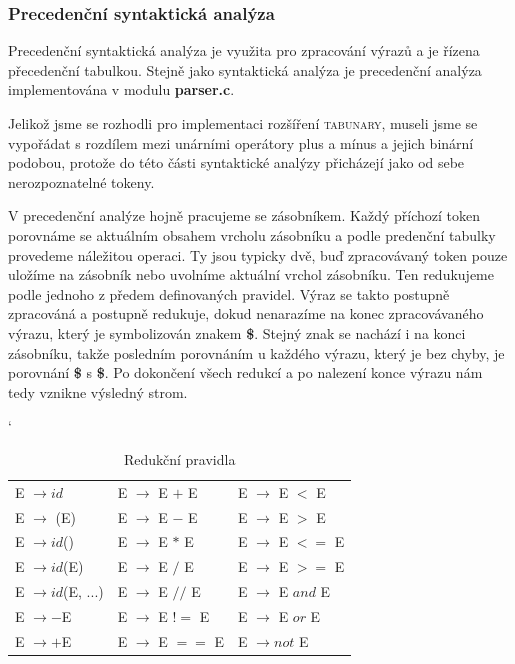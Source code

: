 \documentclass[12pt]{article}
\begin{document}
\subsubsection{Precedenční syntaktická analýza}
Precedenční syntaktická analýza je využita pro zpracování výrazů a je řízena přecedenční tabulkou. Stejně jako syntaktická analýza je precedenční analýza implementována v modulu \textbf{parser.c}.

Jelikož jsme se rozhodli pro implementaci rozšíření \textsc{tabunary}, museli jsme se vypořádat s rozdílem mezi unárními operátory plus a mínus a jejich binární podobou, protože do této části syntaktické analýzy přicházejí jako od sebe nerozpoznatelné tokeny. 

V precedenční analýze hojně pracujeme se zásobníkem. Každý příchozí token porovnáme se aktuálním obsahem vrcholu zásobníku a podle predenční tabulky provedeme náležitou operaci. Ty jsou typicky dvě, buď zpracovávaný token pouze uložíme na zásobník nebo uvolníme aktuální vrchol zásobníku. Ten redukujeme podle jednoho z předem definovaných pravidel. Výraz se takto postupně zpracováná a postupně redukuje, dokud nenarazíme na konec zpracovávaného výrazu, který je symbolizován znakem \textbf{\$}. Stejný znak se nachází i na konci zásobníku, takže posledním porovnáním u každého výrazu, který je bez chyby, je porovnání \textbf{\$} s \textbf{\$}. Po dokončení všech redukcí a po nalezení konce výrazu nám tedy vznikne výsledný strom.
\begin{table}[!htbp]
\catcode`
\centering
    \begin{tabular}{l l l}
         E $\rightarrow id$ & E $\rightarrow$ E $+$ E & E $\rightarrow$ E $<$ E \\
         E $\rightarrow $ (E) & E $\rightarrow$ E $-$ E & E $\rightarrow$ E $>$ E \\
         E $\rightarrow id$() & E $\rightarrow$ E $*$ E & E $\rightarrow$ E $<=$ E \\
         E $\rightarrow id$(E) & E $\rightarrow$ E $/$ E & E $\rightarrow$ E $>=$ E \\
         E $\rightarrow id$(E, ...) & E $\rightarrow$ E $//$ E & E $\rightarrow$ E $and$ E \\
         E $\rightarrow -$E & E $\rightarrow$ E $!=$ E & E $\rightarrow$ E $or$ E \\
         E $\rightarrow +$E & E $\rightarrow$ E $==$ E & E $\rightarrow not$ E \\
    \end{tabular}
    \caption{Redukční pravidla}
    \label{tab:2}
\end{table}
\end{document}

